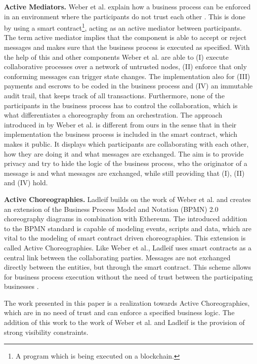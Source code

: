 \documentclass[runningheads]{llncs}
\begin{document}
\textbf{Active Mediators.} Weber et al. explain how a business process can be enforced in an environment where the participants do not trust each other \cite{weber2016untrusted}. This is done by using a smart contract\footnote{A program which is being executed on a blockchain.}, acting as an active mediator between participants. The term active mediator implies that the component is able to accept or reject messages and makes sure that the business process is executed as specified. With the help of this and other components Weber et al. are able to (I) execute collaborative processes over a network of untrusted nodes, (II) enforce that only conforming messages can trigger state changes. The implementation also for (III) payments and escrows to be coded in the business process and (IV) an immutable audit trail, that keeps track of all transactions. Furthermore, none of the participants in the business process has to control the collaboration, which is what differentiates a choreography from an orchestration. The approach introduced in by Weber et al. is different from ours in the sense that in their implementation the business process is included in the smart contract, which makes it public. It displays which participants are collaborating with each other, how they are doing it and what messages are exchanged. The aim is to provide privacy and try to hide the logic of the business process, who the originator of a message is  and what messages are exchanged, while still providing that (I), (II) and (IV) hold.


\textbf{Active Choreographies.} Ladleif builds on the work of Weber et al. and creates an extension of the Business Process Model and Notation (BPMN) 2.0 choreography diagrams in combination with Ethereum. The introduced addition to the BPMN standard is capable of modeling events, scripts and data, which are vital to the modeling of smart contract driven choreographies. This extension is called Active Choreographies. Like   Weber et al., Ladleif uses smart contracts as a central link between the collaborating parties. Messages are not exchanged directly between the entities, but through the smart contract. This scheme allows for business process execution without the need of trust between the participating businesses \cite{ladleif}. 


The work presented in this paper is a realization towards Active Choreographies, which are in no need of trust and can enforce a specified business logic. The addition of this work to the work of Weber et al. and Ladleif is the provision of strong visibility constraints. 
\end{document}
